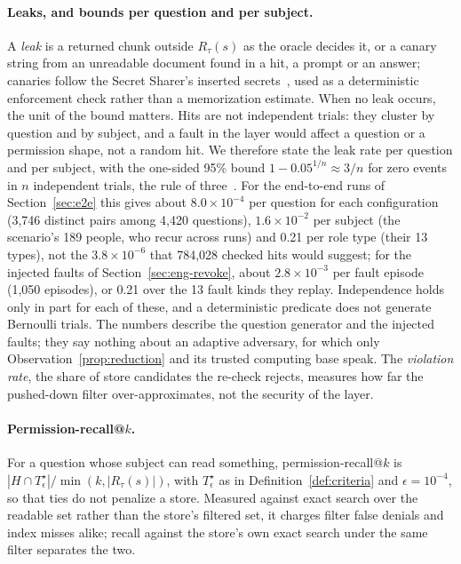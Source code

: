\paragraph{Leaks, and bounds per question and per subject.}
A \emph{leak} is a returned chunk outside $R_\tau(s)$ as the oracle decides it, or a canary string from
an unreadable document found in a hit, a prompt or an answer; canaries follow the Secret Sharer's
inserted secrets~\cite{carlini2019secret}, used as a deterministic enforcement check rather than a
memorization estimate. When no leak occurs, the unit of the bound matters. Hits are not independent
trials: they cluster by question and by subject, and a fault in the layer would affect a question or
a permission shape, not a random hit. We therefore state the leak rate per question and per subject,
with the one-sided 95\% bound $1 - 0.05^{1/n} \approx 3/n$ for zero events in $n$ independent trials, the rule of
three~\cite{hanley1983if}. For the end-to-end runs of Section~\ref{sec:e2e} this gives about
$8.0 \times 10^{-4}$ per question for each configuration (3,746 distinct pairs among 4,420 questions), $1.6 \times 10^{-2}$
per subject (the scenario's 189 people, who recur across runs) and 0.21 per role type (their 13 types), not the $3.8 \times 10^{-6}$ that
784,028 checked hits would suggest; for the injected faults of Section~\ref{sec:eng-revoke}, about
$2.8 \times 10^{-3}$ per fault episode (1,050 episodes), or 0.21 over the 13 fault kinds they replay. Independence holds only in part for each of these, and a deterministic predicate does not generate Bernoulli trials. The numbers describe the
question generator and the injected faults; they say nothing about an adaptive adversary, for
which only Observation~\ref{prop:reduction} and its trusted computing base speak. The
\emph{violation rate}, the share of store candidates the re-check rejects, measures how far the
pushed-down filter over-approximates, not the security of the layer.

\paragraph{Permission-recall@$k$.}
For a question whose subject can read something, permission-recall@$k$ is
$|H \cap T^\star_\epsilon| / \min(k, |R_\tau(s)|)$, with $T^\star_\epsilon$ as in
Definition~\ref{def:criteria} and $\epsilon = 10^{-4}$, so that ties do not penalize a store. Measured against exact search
over the readable set rather than the store's filtered set, it charges filter false denials and index
misses alike; recall against the store's own exact search under the same filter separates the two.

